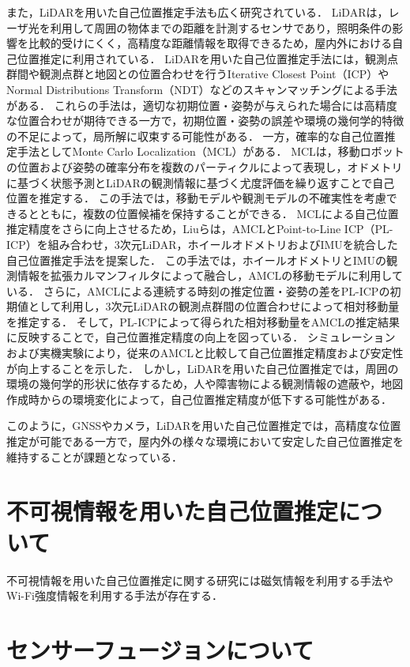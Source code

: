 また，LiDARを用いた自己位置推定手法も広く研究されている．
LiDARは，レーザ光を利用して周囲の物体までの距離を計測するセンサであり，照明条件の影響を比較的受けにくく，高精度な距離情報を取得できるため，屋内外における自己位置推定に利用されている．
LiDARを用いた自己位置推定手法には，観測点群間や観測点群と地図との位置合わせを行うIterative Closest Point（ICP）やNormal Distributions Transform（NDT）などのスキャンマッチングによる手法がある\cite{besl1992method,biber2003normal}．
これらの手法は，適切な初期位置・姿勢が与えられた場合には高精度な位置合わせが期待できる一方で，初期位置・姿勢の誤差や環境の幾何学的特徴の不足によって，局所解に収束する可能性がある．
一方，確率的な自己位置推定手法としてMonte Carlo Localization（MCL）がある\cite{dellaert1999monte}．
MCLは，移動ロボットの位置および姿勢の確率分布を複数のパーティクルによって表現し，オドメトリに基づく状態予測とLiDARの観測情報に基づく尤度評価を繰り返すことで自己位置を推定する．
この手法では，移動モデルや観測モデルの不確実性を考慮できるとともに，複数の位置候補を保持することができる．
MCLによる自己位置推定精度をさらに向上させるため，Liuらは，AMCLとPoint-to-Line ICP（PL-ICP）を組み合わせ，3次元LiDAR，ホイールオドメトリおよびIMUを統合した自己位置推定手法を提案した\cite{liu2022improved}．
この手法では，ホイールオドメトリとIMUの観測情報を拡張カルマンフィルタによって融合し，AMCLの移動モデルに利用している．
さらに，AMCLによる連続する時刻の推定位置・姿勢の差をPL-ICPの初期値として利用し，3次元LiDARの観測点群間の位置合わせによって相対移動量を推定する．
そして，PL-ICPによって得られた相対移動量をAMCLの推定結果に反映することで，自己位置推定精度の向上を図っている．
シミュレーションおよび実機実験により，従来のAMCLと比較して自己位置推定精度および安定性が向上することを示した．
しかし，LiDARを用いた自己位置推定では，周囲の環境の幾何学的形状に依存するため，人や障害物による観測情報の遮蔽や，地図作成時からの環境変化によって，自己位置推定精度が低下する可能性がある．

このように，GNSSやカメラ，LiDARを用いた自己位置推定では，高精度な位置推定が可能である一方で，屋内外の様々な環境において安定した自己位置推定を維持することが課題となっている．

\section{不可視情報を用いた自己位置推定について}
不可視情報を用いた自己位置推定に関する研究には磁気情報を利用する手法やWi-Fi強度情報を利用する手法が存在する．


\section{センサーフュージョンについて}

